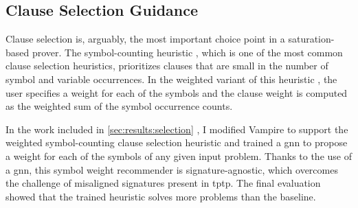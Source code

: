 

\subsection{Clause Selection Guidance}
\label{sec:contrib:ClauseSelection}


Clause selection is, arguably, the most important choice point in a saturation-based prover.
The symbol-counting heuristic \cite{DBLP:conf/cade/SchulzM16}, which is one of the most common clause selection heuristics,
prioritizes clauses that are small in the number of symbol and variable occurrences.
In the weighted variant of this heuristic \cite{E-manual},
the user specifies a weight for each of the symbols
and
the clause weight is computed as the weighted sum of the symbol occurrence counts.

In the work included in \cref{sec:results:selection} \cite{DBLP:conf/lpar/Bartek023},
I modified Vampire to support the weighted symbol-counting clause selection heuristic
and trained a \gls{gnn} to propose a weight for each of the symbols of any given input problem.
Thanks to the use of a \gls{gnn}, this symbol weight recommender is signature-agnostic,
which overcomes the challenge of misaligned signatures present in \gls{tptp}.
The final evaluation showed that
the trained heuristic solves  more problems than the baseline.

